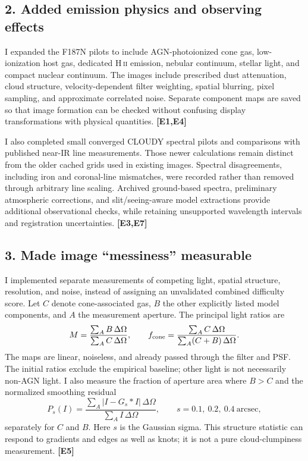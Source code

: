 \documentclass[10pt,letterpaper]{article}
\newcommand{\ev}[1]{\textcolor{ink}{\textbf{[#1]}}}
\newcommand{\hii}{H\,\textsc{ii}}
\begin{document}
\subsection*{2. Added emission physics and observing effects}
I expanded the F187N pilots to include AGN-photoionized cone gas, low-ionization host gas, dedicated
\hii{} emission, nebular continuum, stellar light, and compact nuclear continuum. The images include
prescribed dust attenuation, cloud structure, velocity-dependent filter weighting, spatial blurring,
pixel sampling, and approximate correlated noise. Separate component maps are saved so that image
formation can be checked without confusing display transformations with physical quantities. \ev{E1,E4}

I also completed small converged CLOUDY spectral pilots and comparisons with published near-IR line
measurements. Those newer calculations remain distinct from the older cached grids used in existing
images. Spectral disagreements, including iron and coronal-line mismatches, were recorded rather than
removed through arbitrary line scaling. Archived ground-based spectra, preliminary atmospheric
corrections, and slit/seeing-aware model extractions provide additional observational checks, while
retaining unsupported wavelength intervals and registration uncertainties. \ev{E3,E7}

\subsection*{3. Made image ``messiness'' measurable}
I implemented separate measurements of competing light, spatial structure, resolution, and noise,
instead of assigning an unvalidated combined difficulty score. Let $C$ denote cone-associated gas,
$B$ the other explicitly listed model components, and $A$ the measurement aperture. The principal
light ratios are
\[
 M=\frac{\sum_A B\,\Delta\Omega}{\sum_A C\,\Delta\Omega},
 \qquad
 f_{\rm cone}=\frac{\sum_A C\,\Delta\Omega}{\sum_A(C+B)\,\Delta\Omega}.
\]
The maps are linear, noiseless, and already passed through the filter and PSF. The initial ratios
exclude the empirical baseline; other light is not necessarily non-AGN light. I also measure the
fraction of aperture area where $B>C$ and the normalized smoothing residual
\[
 P_s(I)=\frac{\sum_A |I-G_s*I|\,\Delta\Omega}{\sum_A I\,\Delta\Omega},
 \qquad s=0.1,\ 0.2,\ 0.4\ \mathrm{arcsec},
\]
separately for $C$ and $B$. Here $s$ is the Gaussian sigma. This structure statistic can respond to
gradients and edges as well as knots; it is not a pure cloud-clumpiness measurement. \ev{E5}
\end{document}
